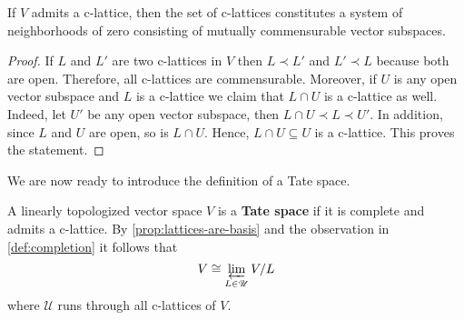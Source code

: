 \begin{proposition}\label{prop:lattices-are-basis}
	If $V$ admits a c-lattice, then the set of c-lattices constitutes a system of neighborhoods of zero consisting of mutually commensurable vector subspaces.
\end{proposition}
\begin{proof}
	If $L$ and $L'$ are two c-lattices in $V$ then $L \prec L'$ and $L' \prec L$ because both are open. Therefore, all c-lattices are commensurable. Moreover, if $U$ is any open vector subspace and $L$ is a c-lattice we claim that $L \cap U$ is a c-lattice as well. Indeed, let $U'$ be any open vector subspace, then $L\cap U \prec L\prec U'$. In addition, since $L$ and $U$ are open, so is $L \cap U$. Hence, $L \cap U \subseteq U$ is a c-lattice. This proves the statement.
\end{proof}
We are now ready to introduce the definition of a Tate space.
\begin{definition}\label{def:tate-vector-space}
	A linearly topologized vector space $V$ is a \textbf{Tate space} if it is complete and admits a c-lattice. By \cref{prop:lattices-are-basis} and the observation in \cref{def:completion} it follows that
	\[
		V \cong \varprojlim_{L \in \mathscr{U}} V/L
	\]
	where $\mathscr{U}$ runs through all c-lattices of $V$.
\end{definition}
